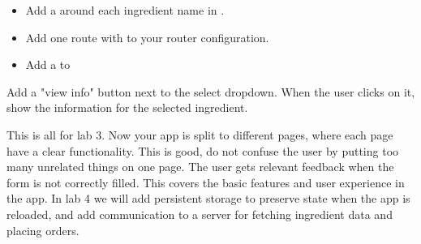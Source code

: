 \documentclass[fleqn, article, a4paper]{memoir}
\begin{document}
\begin{Assignments}
\begin{itemize}
  \item Add a  around each ingredient name in .
  \item Add one route with  to your router configuration.
  \item Add a  to 
\end{itemize}

Add a "view info" button next to the select dropdown. When the user clicks on it, show the information for the selected ingredient.

\item This is all for lab 3. Now your app is split to different pages, where each page have a clear functionality. This is good, do not confuse the user by putting too many unrelated things on one page. The user gets relevant feedback when the form is not correctly filled. This covers the basic features and user experience in the app. In lab 4 we will add persistent storage to preserve state when the app is reloaded, and add communication to a server for fetching ingredient data and placing orders.

\end{Assignments}


\end{document}
